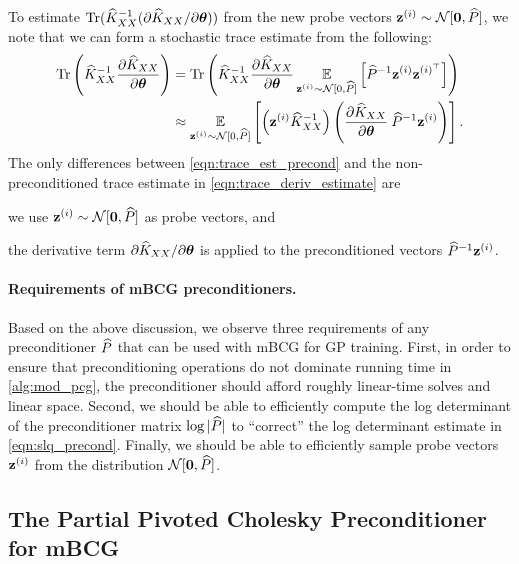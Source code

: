 To estimate $\tr{ \trainK^{-1} (\partial \trainK / \partial \btheta) }$ from the new probe vectors $\bz^{(i)} \sim \normaldist{\bzero}{\trainP}$,
we note that we can form a stochastic trace estimate from the following:
\begin{align}
	\tr{\trainK^{-1}\frac{\partial \trainK}{\partial \btheta}}
	&=
	\tr{
		\trainK^{-1}\frac{\partial \trainK}{\partial \btheta}
		\Evover{\bz^{(i)} \sim \normaldist{0}{\trainP} }{
			\trainP^{-1} \bz^{(i)} \bz^{(i)^\top}
		}
	}
  \nonumber \\
	&\approx
	\Evover{\bz^{(i)} \sim \normaldist{0}{\trainP} }{
		\left( \bz^{(i)} \trainK^{-1} \right)
		\left( \frac{\partial \trainK}{\partial \btheta} \: \trainP^{-1} \bz^{(i)} \right)
	}.
	\label{eqn:trace_est_precond}
\end{align}
%
The only differences between \cref{eqn:trace_est_precond} and the non-preconditioned trace estimate in \cref{eqn:trace_deriv_estimate} are
\begin{enumerate*}
	\item we use $\bz^{(i)} \sim \normaldist{\bzero}{\trainP}$ as probe vectors, and
	\item the derivative term $\partial \widehat{K}_{XX} / \partial \boldsymbol{\theta}$ is applied to the preconditioned vectors $\widehat{P}^{-1} \mathbf{z}^{(i)}$.
\end{enumerate*}

\paragraph{Requirements of mBCG preconditioners.}
Based on the above discussion, we observe three requirements of any preconditioner $\widehat{P}$ that can be used with mBCG for GP training.
First, in order to ensure that preconditioning operations do not dominate running time in \cref{alg:mod_pcg}, the preconditioner should afford roughly linear-time solves and linear space.
Second, we should be able to efficiently compute the log determinant of the preconditioner matrix $\log \vert \widehat{P} \vert$ to ``correct'' the log determinant estimate in \cref{eqn:slq_precond}.
Finally, we should be able to efficiently sample probe vectors $\mathbf{z}^{(i)}$ from the distribution $\normaldist{\bzero}{\trainP}$.



\subsection{The Partial Pivoted Cholesky Preconditioner for mBCG}
\label{sec:piv_chol_precond}

